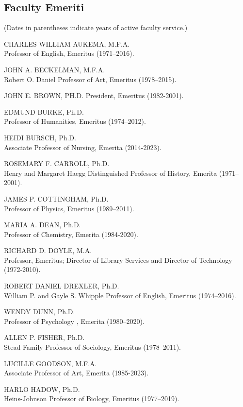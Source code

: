 \documentclass[
  letterpaper,
]{scrbook}
\begin{document}
\subsection{Faculty Emeriti}\label{faculty-emeriti}

(Dates in parentheses indicate years of active faculty service.)

CHARLES WILLIAM AUKEMA, M.F.A.\\
Professor of English, Emeritus (1971--2016).

JOHN A. BECKELMAN, M.F.A.\\
Robert O. Daniel Professor of Art, Emeritus (1978--2015).

JOHN E. BROWN, PH.D. President, Emeritus (1982-2001).

EDMUND BURKE, Ph.D.\\
Professor of Humanities, Emeritus (1974--2012).

HEIDI BURSCH, Ph.D.\\
Associate Professor of Nursing, Emerita (2014-2023).

ROSEMARY F. CARROLL, Ph.D.\\
Henry and Margaret Haegg Distinguished Professor of History, Emerita
(1971--2001).

JAMES P. COTTINGHAM, Ph.D.\\
Professor of Physics, Emeritus (1989--2011).

MARIA A. DEAN, Ph.D.\\
Professor of Chemistry, Emerita (1984-2020).

RICHARD D. DOYLE, M.A.\\
Professor, Emeritus; Director of Library Services and Director of
Technology (1972-2010).

ROBERT DANIEL DREXLER, Ph.D.\\
William P. and Gayle S. Whipple Professor of English, Emeritus
(1974--2016).

WENDY DUNN, Ph.D.\\
Professor of Psychology , Emerita (1980--2020).

ALLEN P. FISHER, Ph.D.\\
Stead Family Professor of Sociology, Emeritus (1978--2011).

LUCILLE GOODSON, M.F.A.\\
Associate Professor of Art, Emerita (1985-2023).

HARLO HADOW, Ph.D.\\
Heins-Johnson Professor of Biology, Emeritus (1977--2019).
\end{document}
